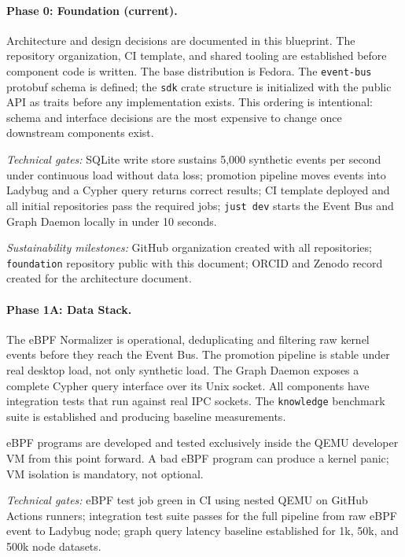 \paragraph{Phase 0: Foundation (current).}
Architecture and design decisions are documented in this blueprint. The
repository organization, CI template, and shared tooling are established before
component code is written. The base distribution is Fedora. The
\texttt{event-bus} protobuf schema is defined; the \texttt{sdk} crate structure
is initialized with the public API as traits before any implementation exists.
This ordering is intentional: schema and interface decisions are the most
expensive to change once downstream components exist.

\emph{Technical gates:} SQLite write store sustains 5,000 synthetic events per
second under continuous load without data loss; promotion pipeline moves events
into Ladybug and a Cypher query returns correct results; CI template deployed
and all initial repositories pass the required jobs; \texttt{just dev} starts
the Event Bus and Graph Daemon locally in under 10 seconds.

\emph{Sustainability milestones:} GitHub organization created with all
repositories; \texttt{foundation} repository public with this document;
ORCID and Zenodo record created for the architecture document.

\paragraph{Phase 1A: Data Stack.}
The eBPF Normalizer is operational, deduplicating and filtering raw kernel
events before they reach the Event Bus. The promotion pipeline is stable under
real desktop load, not only synthetic load. The Graph Daemon exposes a complete
Cypher query interface over its Unix socket. All components have integration
tests that run against real IPC sockets. The \texttt{knowledge} benchmark
suite is established and producing baseline measurements.

eBPF programs are developed and tested exclusively inside the QEMU developer
VM from this point forward. A bad eBPF program can produce a kernel panic; VM
isolation is mandatory, not optional.

\emph{Technical gates:} eBPF test job green in CI using nested QEMU on GitHub
Actions runners; integration test suite passes for the full pipeline from raw
eBPF event to Ladybug node; graph query latency baseline established for 1k,
50k, and 500k node datasets.

